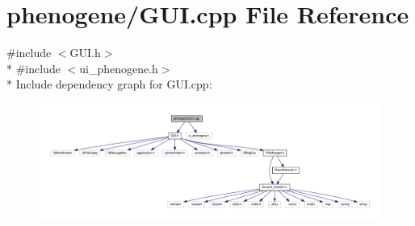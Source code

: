 \hypertarget{a00009}{\section{phenogene/\-G\-U\-I.cpp File Reference}
\label{da/da0/a00009}
}
{\ttfamily \#include $<$G\-U\-I.\-h$>$}\\*
{\ttfamily \#include $<$ui\-\_\-phenogene.\-h$>$}\\*
Include dependency graph for G\-U\-I.\-cpp\-:
\nopagebreak
\begin{figure}[H]
\begin{center}
\leavevmode
\includegraphics[width=350pt]{dc/d3c/a00028}
\end{center}
\end{figure}
